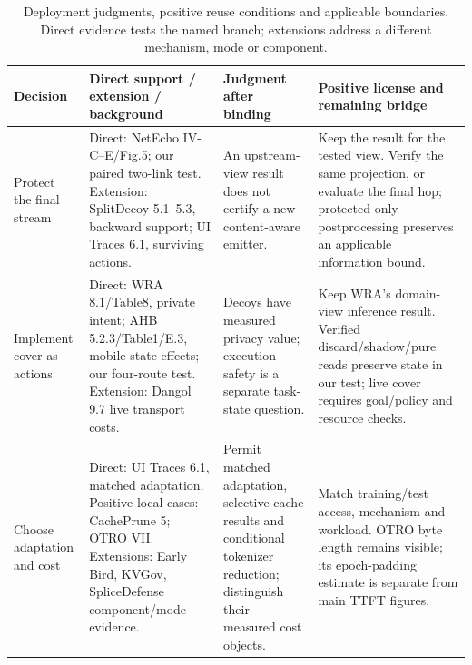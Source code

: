 \begin{table}[t]\centering\footnotesize
\caption{Deployment judgments, positive reuse conditions and applicable boundaries. Direct evidence tests the named branch; extensions address a different mechanism, mode or component.}\label{tab:synthesis-decisions}
\begin{tabularx}{\textwidth}{@{}p{}p{}YY@{}}\toprule
Decision & Direct support / extension / background & Judgment after binding & Positive license and remaining bridge\\\midrule
Protect the final stream & Direct: NetEcho IV-C--E/Fig.5; our paired two-link test. Extension: SplitDecoy 5.1--5.3, backward support; UI Traces 6.1, surviving actions. & An upstream-view result does not certify a new content-aware emitter. & Keep the result for the tested view. Verify the same projection, or evaluate the final hop; protected-only postprocessing preserves an applicable information bound.\\
Implement cover as actions & Direct: WRA 8.1/Table8, private intent; AHB 5.2.3/Table1/E.3, mobile state effects; our four-route test. Extension: Dangol 9.7 live transport costs. & Decoys have measured privacy value; execution safety is a separate task-state question. & Keep WRA's domain-view inference result. Verified discard/shadow/pure reads preserve state in our test; live cover requires goal/policy and resource checks.\\
Choose adaptation and cost & Direct: UI Traces 6.1, matched adaptation. Positive local cases: CachePrune 5; OTRO VII. Extensions: Early Bird, KVGov, SpliceDefense component/mode evidence. & Permit matched adaptation, selective-cache results and conditional tokenizer reduction; distinguish their measured cost objects. & Match training/test access, mechanism and workload. OTRO byte length remains visible; its epoch-padding estimate is separate from main TTFT figures.\\\bottomrule
\end{tabularx}\end{table}
